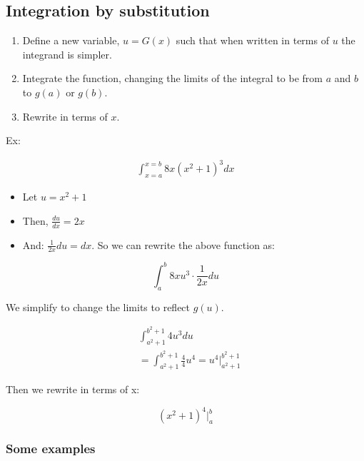 \subsection{Integration by substitution}

\begin{enumerate}
    \item Define a new variable, $u = G(x)$ such that when written in terms of $u$ the integrand is simpler.
    \item Integrate the function, changing the limits of the integral to be from $a$ and $b$ to $g(a)$ or $g(b)$.
    \item Rewrite in terms of $x$.
\end{enumerate}

Ex:

\begin{align*}
    \int_{x=a}^{x=b} 8x(x^2 + 1)^3dx
\end{align*}

\begin{itemize}
    \item Let $u = x^2 + 1$
    \item Then, $\frac{du}{dx} = 2x$
    \item And: $\frac{1}{2x}du = dx$. So we can rewrite the above function as:
\end{itemize}

\vspace{-1em}

\begin{equation*}
    \int_a^b 8xu^3 \cdot \frac{1}{2x}
    du
\end{equation*}

We simplify to change the limits to reflect $g(u)$.

\vspace{-1em}

\begin{align*}
    & \int_{a^2 + 1}^{b^2 + 1} 4u^3 du \\
    & =  \int_{a^2 + 1}^{b^2 + 1} \frac{4}{4}u^4 = u^4 \Big\vert_{a^2 + 1}^{b^2 + 1}
\end{align*}

Then we rewrite in terms of x:

\vspace{-1em}

\begin{equation*}
    (x^2 + 1)^4 \Big\vert_a^b
\end{equation*}  

\subsubsection{Some examples}

